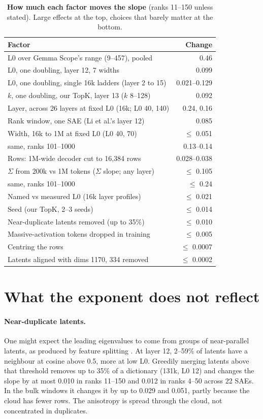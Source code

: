 \documentclass[10pt,twocolumn]{article}
\begin{document}
\begin{table}[t]
\centering
\small
\caption{\textbf{How much each factor moves the slope} (ranks 11--150 unless stated). Large effects at the top, choices that barely matter at the bottom.}
\label{tab:ledger}
\begin{tabular}{@{}p{}@{\hspace{4pt}}r@{}}
\toprule
Factor & Change \\
\midrule
L0 over Gemma Scope's range (9--457), pooled & 0.46 \\
L0, one doubling, layer 12, 7 widths & 0.099 \\
L0, one doubling, single 16k ladders (layer 2 to 15) & 0.021--0.129 \\
$k$, one doubling, our TopK, layer 13 ($k$ 8--128) & 0.092 \\
Layer, across 26 layers at fixed L0 (16k; L0 40, 140) & 0.24, 0.16 \\
Rank window, one SAE (Li et al.'s layer 12) & 0.085 \\
Width, 16k to 1M at fixed L0 (L0 40, 70) & $\le$ 0.051 \\
\quad same, ranks 101--1000 & 0.13--0.14 \\
Rows: 1M-wide decoder cut to 16,384 rows & 0.028--0.038 \\
$\Sigma$ from 200k vs 1M tokens ($\Sigma$ slope; any layer) & $\le$ 0.105 \\
\quad same, ranks 101--1000 & $\le$ 0.24 \\
\midrule
Named vs measured L0 (16k layer profiles) & $\le$ 0.021 \\
Seed (our TopK, 2--3 seeds) & $\le$ 0.014 \\
Near-duplicate latents removed (up to 35\%) & $\le$ 0.010 \\
Massive-activation tokens dropped in training & $\le$ 0.005 \\
Centring the rows & $\le$ 0.0007 \\
Latents aligned with dims 1170, 334 removed & $\le$ 0.0002 \\
\bottomrule
\end{tabular}
\end{table}

\section{What the exponent does not reflect}
\label{sec:not}

\paragraph{Near-duplicate latents.} One might expect the leading eigenvalues to come from groups of near-parallel latents, as produced by feature splitting \citep{chanin2025absorption}. At layer 12, 2--59\% of latents have a neighbour at cosine above 0.5, more at low L0. Greedily merging latents above that threshold removes up to 35\% of a dictionary (131k, L0 12) and changes the slope by at most 0.010 in ranks 11--150 and 0.012 in ranks 4--50 across 22 SAEs. In the bulk windows it changes it by up to 0.029 and 0.051, partly because the cloud has fewer rows. The anisotropy is spread through the cloud, not concentrated in duplicates.
\end{document}
